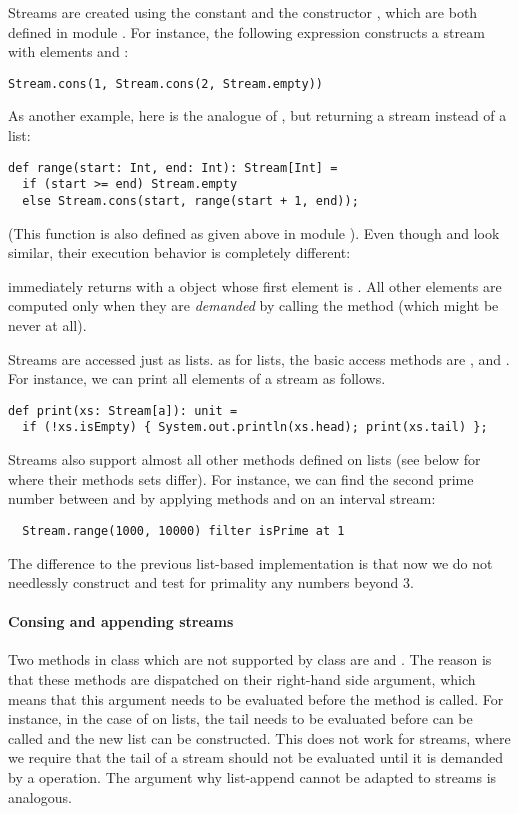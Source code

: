 {Streams are created using the constant  and the constructor ,
which are both defined in module . For instance, the following
expression constructs a stream with elements  and :
\begin{lstlisting}
Stream.cons(1, Stream.cons(2, Stream.empty))
\end{lstlisting}
As another example, here is the analogue of ,
but returning a stream instead of a list:
\begin{lstlisting}
def range(start: Int, end: Int): Stream[Int] = 
  if (start >= end) Stream.empty
  else Stream.cons(start, range(start + 1, end));
\end{lstlisting}
(This function is also defined as given above in module
).  Even though  and 
look similar, their execution behavior is completely different: 

 immediately returns with a  object
whose first element is .  All other elements are computed
only when they are \emph{demanded} by calling the  method
(which might be never at all).  

Streams are accessed just as lists. as for lists, the basic access
methods are ,  and . For instance,
we can print all elements of a stream as follows.
\begin{lstlisting}
def print(xs: Stream[a]): unit = 
  if (!xs.isEmpty) { System.out.println(xs.head); print(xs.tail) };
\end{lstlisting}
Streams also support almost all other methods defined on lists (see
below for where their methods sets differ). For instance, we can find
the second prime number between  and  by applying methods
 and  on an interval stream:
\begin{lstlisting}
  Stream.range(1000, 10000) filter isPrime at 1
\end{lstlisting}
The difference to the previous list-based implementation is that now
we do not needlessly construct and test for primality any numbers
beyond 3.

\paragraph{Consing and appending streams} Two methods in class 
which are not supported by class  are \code{::} and
\code{:::}.  The reason is that these methods are dispatched on their
right-hand side argument, which means that this argument needs to be
evaluated before the method is called. For instance, in the case of
 on lists, the tail  needs to be evaluated
before \code{::} can be called and the new list can be constructed.
This does not work for streams, where we require that the tail of a
stream should not be evaluated until it is demanded by a  operation.
The argument why list-append \code{:::} cannot be adapted to streams is analogous.

}

